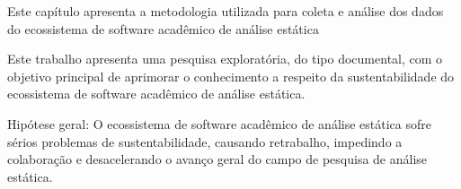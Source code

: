 {Este capítulo apresenta a metodologia utilizada para coleta e análise dos
dados do ecossistema de software acadêmico de análise estática}
\label{metodologia}

Este trabalho apresenta uma pesquisa exploratória, do tipo documental, com o
objetivo principal de aprimorar o conhecimento a respeito da sustentabilidade
do ecossistema de software acadêmico de análise estática.

Hipótese geral: O ecossistema de software acadêmico de análise
estática sofre sérios problemas de sustentabilidade, causando retrabalho,
impedindo a colaboração e desacelerando o avanço geral do campo de pesquisa de
análise estática.









%
%

